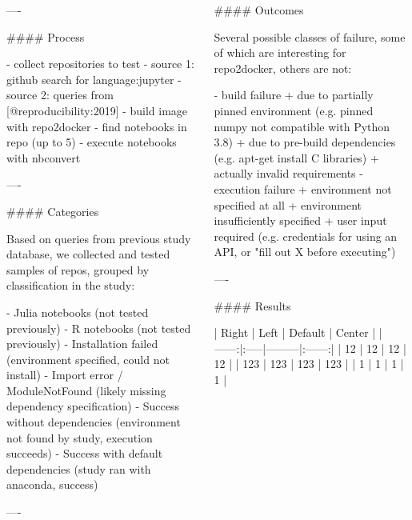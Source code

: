 \documentclass{beamer}
\begin{document}
\begin{frame}[fragile]
\begin{columns}[T]
\begin{column}{.46\textwidth}
\begin{markdown}
----


#### Process

- collect repositories to test
    - source 1: github search for language:jupyter
    - source 2: queries from [@reproducibility:2019]
- build image with repo2docker
- find notebooks in repo (up to 5)
- execute notebooks with nbconvert


----

#### Categories

Based on queries from previous study database, we collected and tested samples of repos,
grouped by classification in the study:

- Julia notebooks (not tested previously)
- R notebooks (not tested previously)
- Installation failed (environment specified, could not install)
- Import error / ModuleNotFound (likely missing dependency specification)
- Success without dependencies (environment not found by study, execution succeeds)
- Success with default dependencies (study ran with anaconda, success)

----


\end{markdown}

\end{column}

\begin{column}{.46\textwidth}

\begin{markdown}

#### Outcomes

Several possible classes of failure,
some of which are interesting for repo2docker,
others are not:

- build failure
    + due to partially pinned environment (e.g. pinned numpy not compatible with Python 3.8)
    + due to pre-build dependencies (e.g. apt-get install C libraries)
    + actually invalid requirements
- execution failure
    + environment not specified at all
    + environment insufficiently specified
    + user input required (e.g. credentials for using an API, or "fill out X before executing")


----

#### Results




| Right | Left | Default | Center |
|------:|:-----|---------|:------:|
|  12   |  12  |  12     |   12   |
| 123   |  123 |   123   |  123   |
|   1   |    1 |     1   |    1   |


\end{markdown}
\end{column}
\end{columns}
\end{frame}
\end{document}
